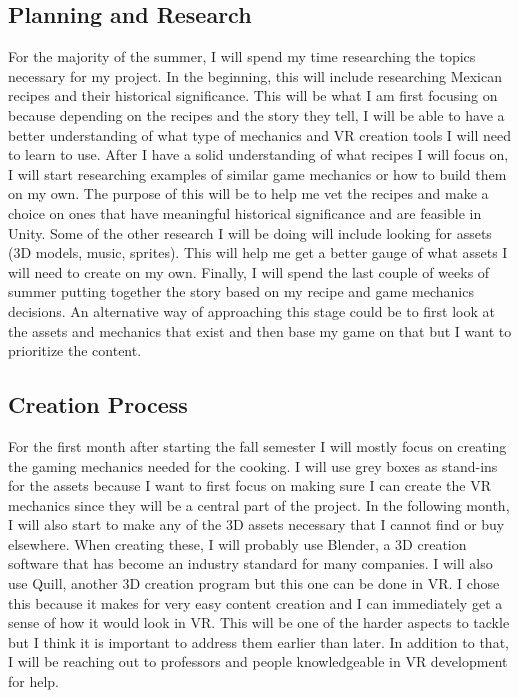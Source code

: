 \documentclass[11pt,twocolumn]{article}
\begin{document}
\subsection{Planning and Research} 
For the majority of the summer, I will spend my time researching the topics necessary for my project. In the beginning, this will include researching Mexican recipes and their historical significance. This will be what I am first focusing on because depending on the recipes and the story they tell, I will be able to have a better understanding of what type of mechanics and VR creation tools I will need to learn to use. After I have a solid understanding of what recipes I will focus on, I will start researching examples of similar game mechanics or how to build them on my own. The purpose of this will be to help me vet the recipes and make a choice on ones that have meaningful historical significance and are feasible in Unity. Some of the other research I will be doing will include looking for assets (3D models, music, sprites). This will help me get a better gauge of what assets I will need to create on my own. Finally, I will spend the last couple of weeks of summer putting together the story based on my recipe and game mechanics decisions. An alternative way of approaching this stage could be to first look at the assets and mechanics that exist and then base my game on that but I want to prioritize the content.
 
\subsection{Creation Process}
For the first month after starting the fall semester I will mostly focus on creating the gaming mechanics needed for the cooking. I will use grey boxes as stand-ins for the assets because I want to first focus on making sure I can create the VR mechanics since they will be a central part of the project. In the following month, I will also start to make any of the 3D assets necessary that I cannot find or buy elsewhere. When creating these, I will probably use Blender, a 3D creation software that has become an industry standard for many companies. I will also use Quill, another 3D creation program but this one can be done in VR. I chose this because it makes for very easy content creation and I can immediately get a sense of how it would look in VR. This will be one of the harder aspects to tackle but I think it is important to address them earlier than later. In addition to that, I will be reaching out to professors and people knowledgeable in VR development for help. 
\end{document}

